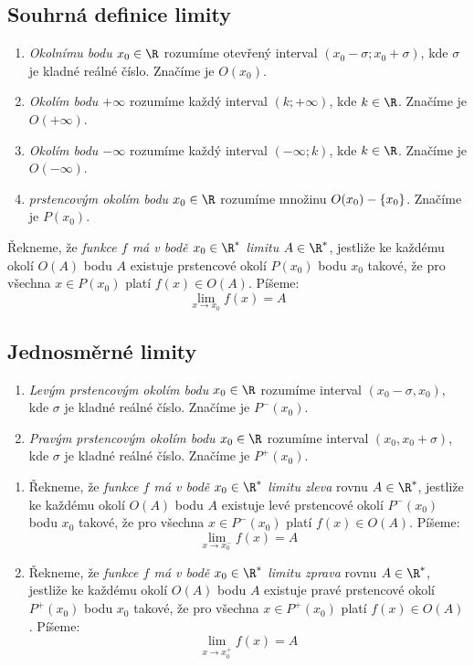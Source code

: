 \subsection{Souhrná definice limity}

\begin{enumerate}
\item
\Def 
\emph{Okolnímu bodu $x_0\in\R$} rozumíme otevřený interval $(x_0-\sigma;x_0+\sigma)$, kde $\sigma$ je kladné reálné číslo.
Značíme je $O(x_0)$.
\item \emph{Okolím bodu $+\infty$} rozumíme každý interval $(k;+\infty)$, kde $k\in\R$.
Značíme je $O(+\infty)$.
\item \emph{Okolím bodu $-\infty$} rozumíme každý interval $(-\infty;k)$, kde $k\in\R$.
Značíme je $O(-\infty)$.
\item \emph{prstencovým okolím bodu $x_0\in\R$} rozumíme množinu $O(x_0)-\left\{{x_0}\right\}$. Značíme je $P(x_0)$.
\end{enumerate}

\Def Řekneme, že \emph{funkce $f$ má v bodě $x_0\in\R^*$ limitu $A\in\R^*$},
jestliže ke každému okolí $O(A)$ bodu $A$ existuje prstencové okolí $P(x_0)$ bodu $x_0$ takové, že
pro všechna $x\in P(x_0)$ platí $f(x)\in O(A)$.
Píšeme:
$$\lim_{x\rightarrow x_0} f(x) = A$$

\subsection{Jednosměrné limity}
\begin{enumerate}
\item
\Def 
\emph{Levým prstencovým okolím bodu $x_0\in\R$} rozumíme interval $(x_0-\sigma,x_0)$, kde $\sigma$ je kladné reálné číslo.
Značíme je $P^-(x_0)$.
\item \emph{Pravým prstencovým okolím bodu $x_0\in\R$} rozumíme interval $(x_0,x_0+\sigma)$, kde $\sigma$ je kladné reálné číslo.
Značíme je $P^+(x_0)$.
\end{enumerate}

\begin{enumerate}
\item 
\Def
Řekneme, že \emph{funkce $f$ má v bodě $x_0\in\R^*$ limitu zleva} rovnu  $A\in\R^*$,
jestliže ke každému okolí $O(A)$ bodu $A$ existuje levé prstencové okolí $P^-(x_0)$ bodu $x_0$ takové, že
pro všechna $x\in P^-(x_0)$ platí $f(x)\in O(A)$.
Píšeme:
$$\lim_{x\rightarrow x_0^-} f(x) = A$$
\item 
Řekneme, že \emph{funkce $f$ má v bodě $x_0\in\R^*$ limitu zprava} rovnu  $A\in\R^*$,
jestliže ke každému okolí $O(A)$ bodu $A$ existuje pravé prstencové okolí $P^+(x_0)$ bodu $x_0$ takové, že
pro všechna $x\in P^+(x_0)$ platí $f(x)\in O(A)$.
Píšeme:
$$\lim_{x\rightarrow x_0^+} f(x) = A$$
\end{enumerate}

\EndDoc

